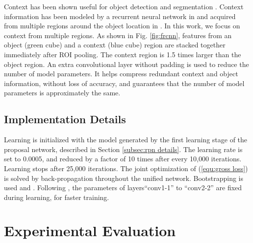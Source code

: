\documentclass[runningheads]{llncs}
\begin{document}
Context has been shown useful for object detection \cite{DBLP:conf/iccv/GidarisK15,DBLP:conf/nips/XiaozhiNIPS15,DBLP:conf/cvpr/BellZBG16} and segmentation \cite{DBLP:conf/cvpr/ZhuUSF15}. Context information has been modeled by a recurrent neural network in \cite{DBLP:conf/cvpr/BellZBG16}
and acquired from multiple regions around the object location in
\cite{DBLP:conf/iccv/GidarisK15,DBLP:conf/nips/XiaozhiNIPS15,DBLP:conf/cvpr/ZhuUSF15}. In this work, we focus on context from multiple
regions.
As shown in Fig. \ref{fig:frcnn}, features from an object (green cube) and
a context (blue cube) region are stacked together immediately after ROI
pooling. The context region is 1.5 times larger than the object region.
An extra convolutional layer without padding is used to reduce
the number of model parameters. It helps compress redundant context and object information, without loss of accuracy, and guarantees that
the number of model parameters is approximately the same.


\subsection{Implementation Details}

Learning is initialized with the model generated by the first learning stage
of the proposal network, described in Section \ref{subsec:rpn details}. The
learning rate is set to 0.0005, and reduced by a factor of 10 times after
every 10,000 iterations. Learning stops after 25,000 iterations. The joint
optimization of (\ref{equ:gross loss}) is solved by back-propagation
throughout the unified network. Bootstrapping is used and .
Following \cite{DBLP:conf/iccv/Girshick15}, the parameters of
layers``conv1-1'' to ``conv2-2'' are fixed during learning, for faster
training.




\section{Experimental Evaluation}
\end{document}
